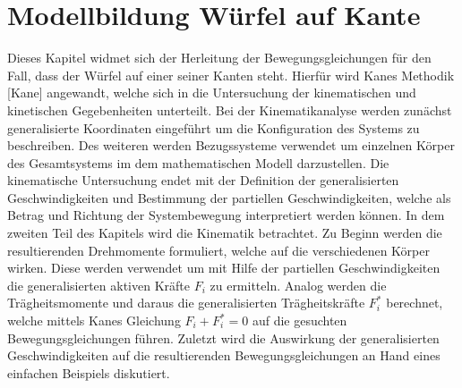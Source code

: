 \ifx\FORMAT\undefined


\fi

\chapter{Modellbildung Würfel auf Kante}\label{chapter_TM_Edge}
Dieses Kapitel widmet sich der Herleitung der Bewegungsgleichungen für den Fall, dass der Würfel auf einer seiner Kanten steht. Hierfür wird Kanes Methodik [Kane] angewandt, welche sich in die Untersuchung der kinematischen und kinetischen Gegebenheiten unterteilt. Bei der Kinematikanalyse werden zunächst generalisierte Koordinaten eingeführt um die Konfiguration des Systems zu beschreiben. Des weiteren werden Bezugssysteme verwendet um einzelnen Körper des Gesamtsystems im dem mathematischen Modell darzustellen. Die kinematische Untersuchung endet mit der Definition der generalisierten Geschwindigkeiten und Bestimmung der partiellen Geschwindigkeiten, welche als Betrag und Richtung der Systembewegung interpretiert werden können.
In dem zweiten Teil des Kapitels wird die Kinematik betrachtet. Zu Beginn werden die resultierenden Drehmomente formuliert, welche auf die verschiedenen Körper wirken. Diese werden verwendet um mit Hilfe der partiellen Geschwindigkeiten die generalisierten aktiven Kräfte $F_i$ zu ermitteln. Analog werden die Trägheitsmomente und daraus die generalisierten Trägheitskräfte $F^*_i$ berechnet, welche mittels Kanes Gleichung $F_i+F^*_i=0$ auf die gesuchten Bewegungsgleichungen führen. Zuletzt wird die Auswirkung der generalisierten Geschwindigkeiten auf die resultierenden Bewegungsgleichungen an Hand eines einfachen Beispiels diskutiert.
\newpage

\newpage


\ifx\FORMAT\undefined

\fi
